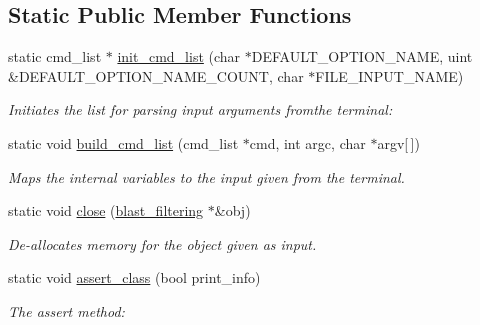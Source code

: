 \subsection*{Static Public Member Functions}
\begin{DoxyCompactItemize}
\item 
\hypertarget{classblast__filtering_a7ec47f047eed05042ba52626832fd746}{
static cmd\_\-list $\ast$ \hyperlink{classblast__filtering_a7ec47f047eed05042ba52626832fd746}{init\_\-cmd\_\-list} (char $\ast$DEFAULT\_\-OPTION\_\-NAME, uint \&DEFAULT\_\-OPTION\_\-NAME\_\-COUNT, char $\ast$FILE\_\-INPUT\_\-NAME)}
\label{classblast__filtering_a7ec47f047eed05042ba52626832fd746}

\begin{DoxyCompactList}\small\item\em Initiates the list for parsing input arguments fromthe terminal: \end{DoxyCompactList}\item 
\hypertarget{classblast__filtering_adc282c8b2b9027557f7651d33e1c791a}{
static void \hyperlink{classblast__filtering_adc282c8b2b9027557f7651d33e1c791a}{build\_\-cmd\_\-list} (cmd\_\-list $\ast$cmd, int argc, char $\ast$argv\mbox{[}$\,$\mbox{]})}
\label{classblast__filtering_adc282c8b2b9027557f7651d33e1c791a}

\begin{DoxyCompactList}\small\item\em Maps the internal variables to the input given from the terminal. \end{DoxyCompactList}\item 
\hypertarget{classblast__filtering_ae3c8f444eb2e8abb59b99bcf2c119dab}{
static void \hyperlink{classblast__filtering_ae3c8f444eb2e8abb59b99bcf2c119dab}{close} (\hyperlink{classblast__filtering}{blast\_\-filtering} $\ast$\&obj)}
\label{classblast__filtering_ae3c8f444eb2e8abb59b99bcf2c119dab}

\begin{DoxyCompactList}\small\item\em De-\/allocates memory for the object given as input. \end{DoxyCompactList}\item 
\hypertarget{classblast__filtering_a3da7d529e50a57dee8a34d9ca0517bd0}{
static void \hyperlink{classblast__filtering_a3da7d529e50a57dee8a34d9ca0517bd0}{assert\_\-class} (bool print\_\-info)}
\label{classblast__filtering_a3da7d529e50a57dee8a34d9ca0517bd0}

\begin{DoxyCompactList}\small\item\em The assert method: \end{DoxyCompactList}\end{DoxyCompactItemize}


